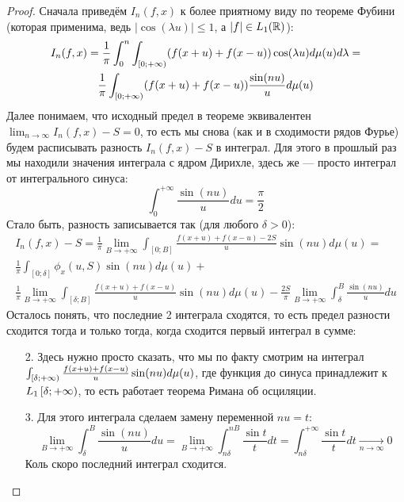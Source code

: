 \begin{proof}
	Сначала приведём $I_n(f, x)$ к более приятному виду по теореме Фубини (которая применима, ведь $|\cos(\lambda u)| \leq 1$, а $|f| \in L_1(\mathbb{R})$):
	\begin{multline*}
		I_n(f, x) = \frac{1}{\pi} \int_0^n \int_{\left[0; +\infty\right)} (f(x + u) + f(x - u))\cos(\lambda u)d\mu(u)d\lambda =
		\\
		\frac{1}{\pi} \int_{\left[0; +\infty\right)} (f(x + u) + f(x - u)) \frac{\sin(nu)}{u}d\mu(u)
	\end{multline*}
	Далее понимаем, что исходный предел в теореме эквивалентен $\lim_{n \to \infty} I_n(f, x) - S = 0$, то есть мы снова (как и в сходимости рядов Фурье) будем расписывать разность $I_n(f, x) - S$ в интеграл. Для этого в прошлый раз мы находили значения интеграла с ядром Дирихле, здесь же --- просто интеграл от интегрального синуса:
	\[
		\int_0^{+\infty} \frac{\sin(nu)}{u}du = \frac{\pi}{2}
	\]
	Стало быть, разность записывается так (для любого $\delta > 0$):
	\begin{multline*}
		I_n(f, x) - S = \frac{1}{\pi} \lim_{B \to +\infty} \int_{[0; B]} \frac{f(x + u) + f(x - u) - 2S}{u}\sin(nu)d\mu(u) =
		\\
		\frac{1}{\pi} \int_{[0; \delta]} \phi_x(u, S)\sin(nu)d\mu(u) +
		\\
		\frac{1}{\pi} \lim_{B \to +\infty} \int_{[\delta; B]} \frac{f(x + u) + f(x - u)}{u}\sin(nu)d\mu(u) - \frac{2S}{\pi} \lim_{B \to +\infty} \int_\delta^B \frac{\sin(nu)}{u}du
	\end{multline*}
	Осталось понять, что последние 2 интеграла сходятся, то есть предел разности сходится тогда и только тогда, когда сходится первый интеграл в сумме:
	\begin{enumerate}
		\item[2.] Здесь нужно просто сказать, что мы по факту смотрим на интеграл \\ $\int_{\left[\delta; +\infty\right)} \frac{f(x + u) + f(x - u)}{u} \sin(nu)d\mu(u)$, где функция до синуса принадлежит к $L_1\left[\delta; +\infty\right)$, то есть работает теорема Римана об осциляции.
		
		\item[3.] Для этого интеграла сделаем замену переменной $nu = t$:
		\[
			\lim_{B \to +\infty} \int_{\delta}^B \frac{\sin(nu)}{u}du = \lim_{B \to +\infty} \int_{n\delta}^{nB} \frac{\sin t}{t}dt = \int_{n\delta}^{+\infty} \frac{\sin t}{t}dt \xrightarrow[n \to \infty]{} 0
		\]
		Коль скоро последний интеграл сходится.
	\end{enumerate}
\end{proof}

